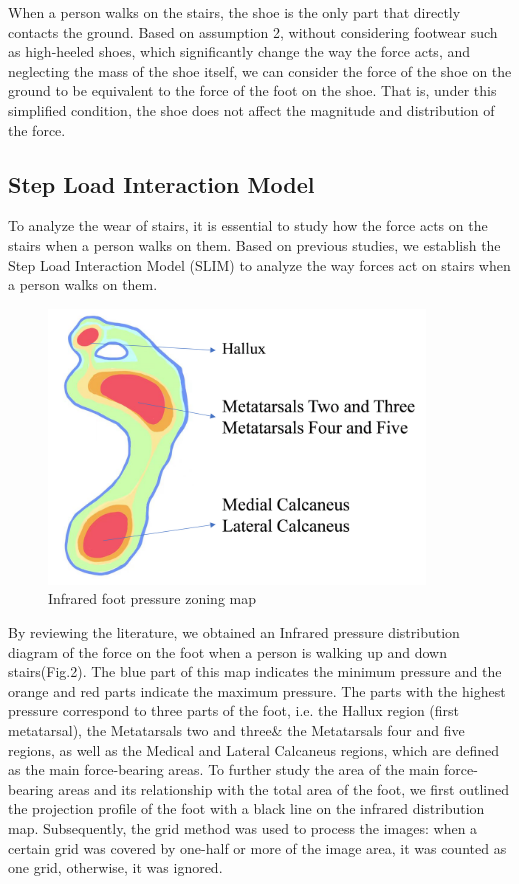 \documentclass{mcmthesis}
\begin{document}
When a person walks on the stairs, the shoe is the only part that directly contacts the ground. Based on assumption 2, without considering footwear such as high-heeled shoes, which significantly change the way the force acts, and neglecting the mass of the shoe itself, we can consider the force of the shoe on the ground to be equivalent to the force of the foot on the shoe. That is, under this simplified condition, the shoe does not affect the magnitude and distribution of the force.  


\subsection{Step Load Interaction Model}
To analyze the wear of stairs, it is essential to study how the force acts on the stairs when a person walks on them. Based on previous studies, we establish the Step Load Interaction Model (SLIM) to analyze the way forces act on stairs when a person walks on them. 
 
\begin{figure}[h]  %
  \small
  \centering  %
  \includegraphics[width=10cm]{3-Infrared foot pressure zoning map.png}
  \caption{Infrared foot pressure zoning map} \label{fig:2}  %
  \end{figure}  %




By reviewing the literature, we obtained an Infrared pressure distribution diagram of the force on the foot when a person is walking up and down stairs\cite{YISX202303023}(Fig.2). The blue part of this map indicates the minimum pressure and the orange and red parts indicate the maximum pressure. The parts with the highest pressure correspond to three parts of the foot, i.e. the Hallux region (first metatarsal), the Metatarsals two and three\& the Metatarsals four and five regions, as well as the Medical and Lateral Calcaneus regions, which are defined as the main force-bearing areas. To further study the area of the main force-bearing areas and its relationship with the total area of the foot, we first outlined the projection profile of the foot with a black line on the infrared distribution map. Subsequently, the grid method was used to process the images: when a certain grid was covered by one-half or more of the image area, it was counted as one grid, otherwise, it was ignored.  
\end{document}
